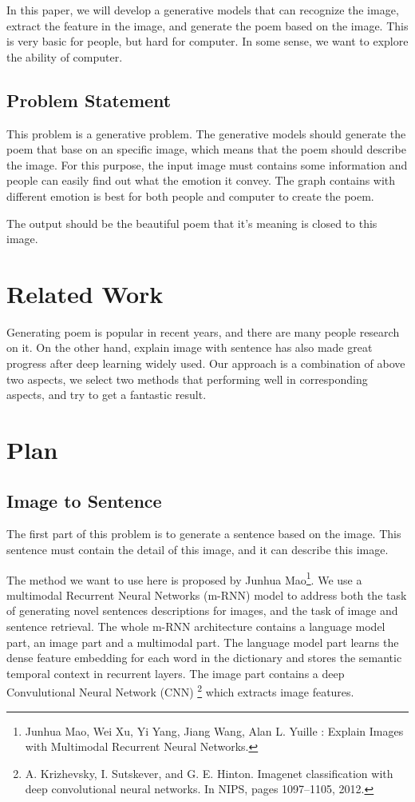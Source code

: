 \documentclass[10pt,twocolumn,letterpaper]{article}
\begin{document}
In this paper, we will develop a generative models that can recognize the image, extract the feature in the image, and generate the poem based on the image. This is very basic for people, but hard for computer. In some sense, we want to explore the ability of computer.
\subsection{Problem Statement}
This problem is a generative problem. The generative models should generate the poem that base on an specific image, which means that the poem should describe the image. For this purpose, the input image must contains some information and people can easily find out what the emotion it convey. The graph contains with different emotion is best for both people and computer to create the poem.

The output should be the beautiful poem that it's meaning is closed to this image.


\section{Related Work}
	Generating poem is popular in recent years, and there are many people research on it. On the other hand, explain image with sentence has also made great progress after deep learning widely used. Our approach is a combination of above two aspects, we select two methods that performing well in corresponding aspects, and try to get a fantastic result.
\section{Plan}
\subsection{Image to Sentence}
The first part of this problem is to generate a sentence based on the image. This sentence must contain the detail of this image, and it can describe this image.

The method we want to use here is proposed by Junhua Mao\footnote{ Junhua Mao, Wei Xu, Yi Yang, Jiang Wang, Alan L. Yuille : Explain Images with Multimodal Recurrent Neural Networks.}. We use a multimodal Recurrent Neural Networks (m-RNN) model to address both the task of generating novel sentences descriptions for images, and the task of image and sentence retrieval. The whole m-RNN architecture contains a language model part, an image part and a multimodal part. The language model part learns the dense feature embedding for each word in the dictionary and stores the semantic temporal context in recurrent layers. The image part contains a deep Convulutional Neural Network (CNN) \footnote{A. Krizhevsky, I. Sutskever, and G. E. Hinton. Imagenet classification with deep convolutional neural networks. In NIPS, pages 1097–1105, 2012.} which extracts image features.
\end{document}

